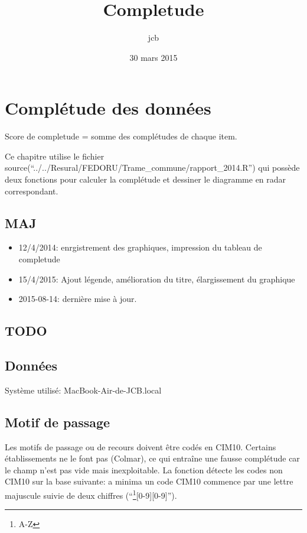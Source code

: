 \documentclass[]{article}
\title{Completude}
\author{jcb}
\date{30 mars 2015}
\let\rmarkdownfootnote\footnote%
\def\footnote{\protect\rmarkdownfootnote}
\begin{document}
\maketitle


{
\hypersetup{linkcolor=black}
\setcounter{tocdepth}{2}
\tableofcontents
}
\section{Complétude des données}\label{completude-des-donnees}

Score de completude = somme des complétudes de chaque item.

Ce chapitre utilise le fichier
source(``../../Resural/FEDORU/Trame\_commune/rapport\_2014.R'') qui
possède deux fonctions pour calculer la complétude et dessiner le
diagramme en radar correspondant.

\subsection{MAJ}\label{maj}

\begin{itemize}
\itemsep1pt\parskip0pt
\item
  12/4/2014: enrgistrement des graphiques, impression du tableau de
  completude
\item
  15/4/2015: Ajout légende, amélioration du titre, élargissement du
  graphique
\item
  2015-08-14: dernière mise à jour.
\end{itemize}

\subsection{TODO}\label{todo}

\subsection{Données}\label{donnees}

Système utilisé: MacBook-Air-de-JCB.local

\subsection{Motif de passage}\label{motif-de-passage}

Les motifs de passage ou de recours doivent être codés en CIM10.
Certains établissements ne le font pas (Colmar), ce qui entraîne une
fausse complétude car le champ n'est pas vide mais inexploitable. La
fonction détecte les codes non CIM10 sur la base suivante: a minima un
code CIM10 commence par une lettre majuscule suivie de deux chiffres
(``\footnote{A-Z}{[}0-9{]}{[}0-9{]}'').
\end{document}
